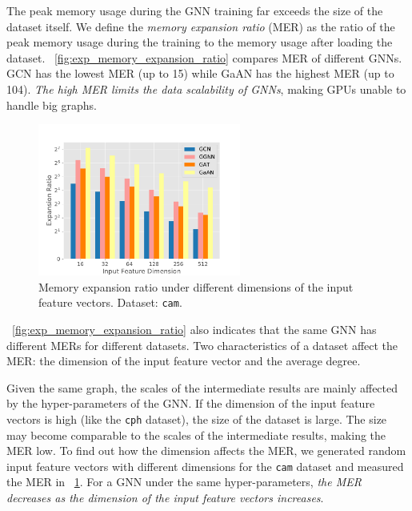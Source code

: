 The peak memory usage during the GNN training far exceeds the size of the dataset itself.
We define the \emph{memory expansion ratio} (MER) as the ratio of the peak memory usage during the training to the memory usage after loading the dataset.
\figurename~\ref{fig:exp_memory_expansion_ratio} compares MER of different GNNs.
GCN has the lowest MER (up to 15) while GaAN has the highest MER (up to 104).
\emph{The high MER limits the data scalability of GNNs}, making GPUs unable to handle big graphs.

\begin{figure}[tbp]
    \centering
    \includegraphics[height=5cm]{figs/experiments/exp_memory_expansion_ratio_input_feature_dimension_com-amazon.pdf}
    \caption{Memory expansion ratio under different dimensions of the input feature vectors. Dataset: \texttt{cam}.}
    \label{fig:exp_memory_expension_ratio_input_feature_dimension}
\end{figure}

\figurename~\ref{fig:exp_memory_expansion_ratio} also indicates that the same GNN has different MERs for different datasets.
Two characteristics of a dataset affect the MER: the dimension of the input feature vector and the average degree.

Given the same graph, the scales of the intermediate results are mainly affected by the hyper-parameters of the GNN.
If the dimension of the input feature vectors is high (like the \texttt{cph} dataset), the size of the dataset is large.
The size may become comparable to the scales of the intermediate results,  making the MER low.
To find out how the dimension affects the MER, we generated random input feature vectors with different dimensions for the \texttt{cam} dataset and measured the MER in \figurename~\ref{fig:exp_memory_expension_ratio_input_feature_dimension}.
For a GNN under the same hyper-parameters, \emph{the MER decreases as the dimension of the input feature vectors increases}.


